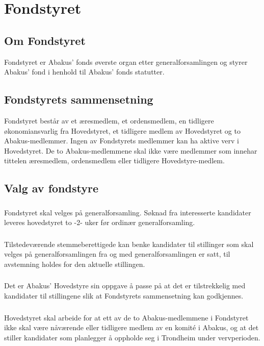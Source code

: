 \section{Fondstyret}
\subsection{Om Fondstyret}
Fondstyret er Abakus’ fonds øverste organ etter generalforsamlingen og styrer
Abakus’ fond i henhold til Abakus’ fonds statutter.

\subsection{Fondstyrets sammensetning}
Fondstyret består av et æresmedlem, et ordensmedlem, en tidligere økonomiansvarlig fra
Hovedstyret, et tidligere medlem av Hovedstyret og to Abakus-medlemmer.
Ingen av Fondstyrets medlemmer kan ha aktive verv i Hovedstyret. De to Abakus-medlemmene
skal ikke være medlemmer som innehar tittelen æresmedlem, ordensmedlem eller tidligere Hovedstyre-medlem.

\subsection{Valg av fondstyre}
\subsubsection{}
Fondstyret skal velges på generalforsamling. Søknad fra interesserte kandidater
leveres hovedstyret to -2- uker før ordinær generalforsamling.

\subsubsection{}
Tilstedeværende stemmeberettigede kan benke kandidater til stillinger som skal velges
på generalforsamlingen fra og med generalforsamlingen er satt, til avstemning holdes for
den aktuelle stillingen.

\subsubsection{}
Det er Abakus’ Hovedstyre sin oppgave å passe på at det er tilstrekkelig med kandidater
til stillingene slik at Fondstyrets sammensetning kan godkjennes.

\subsubsection{}
Hovedstyret skal arbeide for at ett av de to Abakus-medlemmene i Fondstyret ikke skal være nåværende eller tidligere medlem av en komité i Abakus, 
og at det stiller kandidater som planlegger å oppholde seg i Trondheim under vervperioden.

